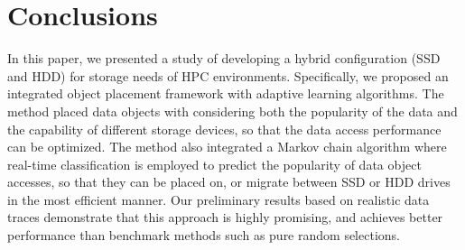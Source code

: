 \section{Conclusions}
\label{sec:conclusion}

In this paper, we presented a study of developing a hybrid configuration (SSD and HDD) for storage needs of HPC environments. Specifically, we proposed an integrated object placement framework with adaptive learning algorithms. The method placed data objects with considering both the popularity of the data and the capability of different storage devices, so that the data access performance can be optimized. The method also integrated a Markov chain algorithm where real-time classification is employed to predict the popularity of data object accesses, so that they can be placed on, or migrate between SSD or HDD drives in the most efficient manner. Our preliminary results based on realistic data traces demonstrate that this approach is highly promising, and achieves better performance than benchmark methods such as pure random selections.
